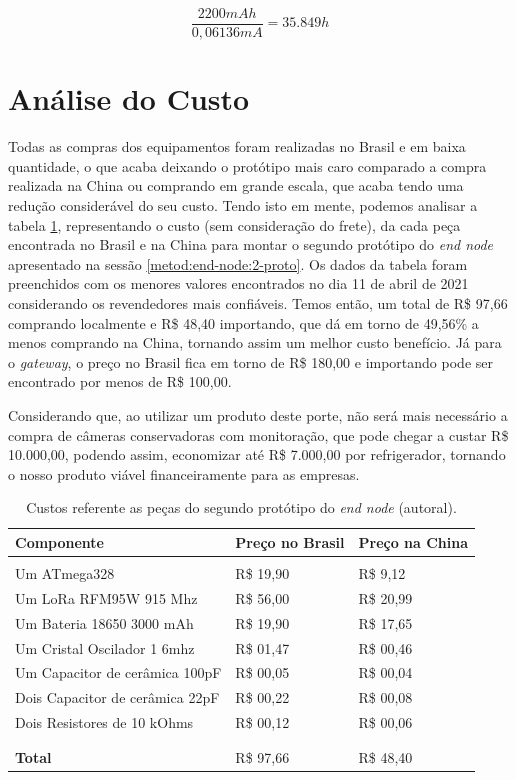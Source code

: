 \begin{equation}
  \frac{2200 mAh}{0,06136 mA} = 35.849 h
  \label{equation:p3-hours} 
\end{equation}

\section{Análise do Custo}
\label{result:custo}
Todas as compras dos equipamentos foram realizadas no Brasil e em baixa quantidade, o que acaba deixando o protótipo mais caro comparado a compra realizada na China ou comprando em grande escala, que acaba tendo uma redução considerável do seu custo. Tendo isto em mente, podemos analisar a tabela \ref{tab:costs-2-proto}, representando o custo (sem consideração do frete), da cada peça encontrada no Brasil e na China para montar o segundo protótipo do \textit{end node} apresentado na sessão \ref{metod:end-node:2-proto}. Os dados da tabela foram preenchidos com os menores valores encontrados no dia 11 de abril de 2021 considerando os revendedores mais confiáveis. Temos então, um total de R\$ 97,66 comprando localmente e R\$ 48,40 importando, que dá em torno de 49,56\% a menos comprando na China, tornando assim um melhor custo benefício.	Já para o \textit{gateway}, o preço no Brasil fica em torno de R\$ 180,00 e importando pode ser encontrado por menos de R\$ 100,00.

Considerando que, ao utilizar um produto deste porte, não será mais necessário a compra de câmeras conservadoras com monitoração, que pode chegar a custar R\$ 10.000,00, podendo assim, economizar até R\$ 7.000,00 por refrigerador, tornando o nosso produto viável financeiramente para as empresas.

\begin{table}[H]
  \centering 
  \scalebox{1} {
    \begin{tabular}{l | l | l}
    \textbf{Componente}&\textbf{Preço no Brasil}&\textbf{Preço na China}\\[5pt] \hline
    &&\\
    Um ATmega328&R\$ 19,90&R\$ 9,12 \\[5pt]
    Um LoRa RFM95W 915 Mhz&R\$ 56,00&R\$ 20,99 \\[5pt]
    Um Bateria 18650 3000 mAh&R\$ 19,90 &R\$ 17,65 \\[5pt]
    Um Cristal Oscilador 1 6mhz&R\$ 01,47&R\$ 00,46 \\[5pt]
    Um Capacitor de cerâmica 100pF&R\$ 00,05&R\$ 00,04 \\[5pt]
    Dois Capacitor de cerâmica 22pF&R\$ 00,22&R\$ 00,08 \\[5pt]
    Dois Resistores de 10 kOhms&R\$ 00,12&R\$ 00,06 \\
    &&\\ \hline
    &&\\
    \textbf{Total}&R\$ 97,66&R\$ 48,40 \\[5pt]
    \end{tabular}
  }
  \caption{Custos referente as peças do segundo protótipo do \textit{end node} (autoral).}
  \label{tab:costs-2-proto}
\end{table}

